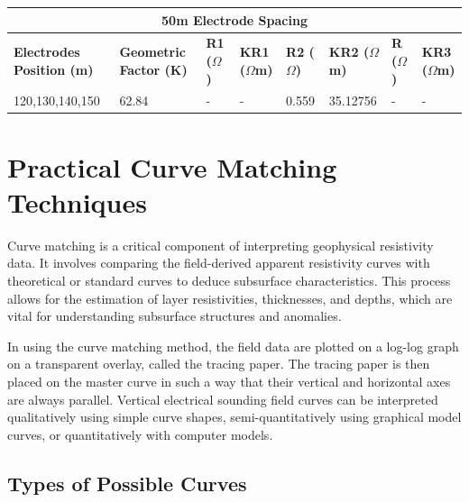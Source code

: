 \documentclass[12pt,a4paper]{report}
\begin{document}
\begin{table}[H]
    \centering
    \begin{adjustbox}{max width=\textwidth}
    \setlength{\tabcolsep}{15pt}
    \renewcommand{\arraystretch}{1.5}
    \begin{tabular}{|p{3.5cm}|p{2.5cm}|p{1.8cm}|p{2.2cm}|p{1.8cm}|p{2.2cm}|p{1.8cm}|p{2.2cm}|}
    \hline
    \multicolumn{8}{|c|}{\rule{0pt}{3em}\huge\textbf{50m Electrode Spacing}} \\ [0.5cm]
    \hline
    \textbf{Electrodes Position (m)} & \textbf{Geometric Factor (K)} & \textbf{R1 ($\Omega$)} & \textbf{KR1 ($\Omega$m)} & \textbf{R2 ($\Omega$)} & \textbf{KR2 ($\Omega$m)} & \textbf{R ($\Omega$)} & \textbf{KR3 ($\Omega$m)} \\ \hline
    120,130,140,150 & 62.84 & - & - & 0.559 & 35.12756 & - & - \\ \hline
    \end{tabular}
\end{adjustbox}
\end{table}

\section{Practical Curve Matching Techniques}

Curve matching is a critical component of interpreting geophysical resistivity data. It involves comparing the field-derived apparent resistivity curves with theoretical or standard curves to deduce subsurface characteristics. This process allows for the estimation of layer resistivities, thicknesses, and depths, which are vital for understanding subsurface structures and anomalies.

In using the curve matching method, the field data are plotted on a log-log graph on a transparent overlay, called the tracing paper. The tracing paper is then placed on the master curve in such a way that their vertical and horizontal axes are always parallel. Vertical electrical sounding field curves can be interpreted qualitatively using simple curve shapes, semi-quantitatively using graphical model curves, or quantitatively with computer models.

\subsection{Types of Possible Curves}
\end{document}
